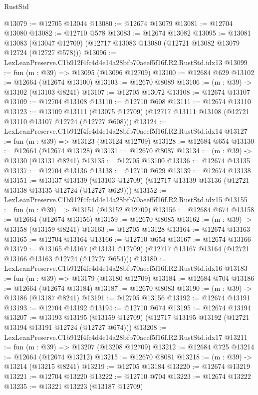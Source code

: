 \begin{lexlean}{RustStd}
\begin{coremodule}
@13079 := @12705 @13044
@13080 := @12674 @13079
@13081 := @12704 @13080
@13082 := @12710 @578
@13083 := @12674 @13082
@13095 := @13081
    @13083
    (@13047 @12709)
    (@12717 @13083 @13080 (@12721 @13082 @13079 @12724 (@12727 @578)))
@13096 := LexLeanPreserve.C1b912f4fc4d4e14a28bfb70aeef5f16f.R2.RustStd.idx13
@13099 := fun (m : @39) => @13095 (@13096 @12709)
@13100 := @12684 @629
@13102 := @12664 (@12674 @13100)
@13103 := @12670 @8089
@13106 := (m : @39) -> @13102 (@13103 @8241)
@13107 := @12705 @13072
@13108 := @12674 @13107
@13109 := @12704 @13108
@13110 := @12710 @608
@13111 := @12674 @13110
@13123 := @13109
    @13111
    (@13075 @12709)
    (@12717 @13111 @13108 (@12721 @13110 @13107 @12724 (@12727 @608)))
@13124 := LexLeanPreserve.C1b912f4fc4d4e14a28bfb70aeef5f16f.R2.RustStd.idx14
@13127 := fun (m : @39) => @13123 (@13124 @12709)
@13128 := @12684 @654
@13130 := @12664 (@12674 @13128)
@13131 := @12670 @8087
@13134 := (m : @39) -> @13130 (@13131 @8241)
@13135 := @12705 @13100
@13136 := @12674 @13135
@13137 := @12704 @13136
@13138 := @12710 @629
@13139 := @12674 @13138
@13151 := @13137
    @13139
    (@13103 @12709)
    (@12717 @13139 @13136 (@12721 @13138 @13135 @12724 (@12727 @629)))
@13152 := LexLeanPreserve.C1b912f4fc4d4e14a28bfb70aeef5f16f.R2.RustStd.idx15
@13155 := fun (m : @39) => @13151 (@13152 @12709)
@13156 := @12684 @674
@13158 := @12664 (@12674 @13156)
@13159 := @12670 @8085
@13162 := (m : @39) -> @13158 (@13159 @8241)
@13163 := @12705 @13128
@13164 := @12674 @13163
@13165 := @12704 @13164
@13166 := @12710 @654
@13167 := @12674 @13166
@13179 := @13165
    @13167
    (@13131 @12709)
    (@12717 @13167 @13164 (@12721 @13166 @13163 @12724 (@12727 @654)))
@13180 := LexLeanPreserve.C1b912f4fc4d4e14a28bfb70aeef5f16f.R2.RustStd.idx16
@13183 := fun (m : @39) => @13179 (@13180 @12709)
@13184 := @12684 @704
@13186 := @12664 (@12674 @13184)
@13187 := @12670 @8083
@13190 := (m : @39) -> @13186 (@13187 @8241)
@13191 := @12705 @13156
@13192 := @12674 @13191
@13193 := @12704 @13192
@13194 := @12710 @674
@13195 := @12674 @13194
@13207 := @13193
    @13195
    (@13159 @12709)
    (@12717 @13195 @13192 (@12721 @13194 @13191 @12724 (@12727 @674)))
@13208 := LexLeanPreserve.C1b912f4fc4d4e14a28bfb70aeef5f16f.R2.RustStd.idx17
@13211 := fun (m : @39) => @13207 (@13208 @12709)
@13212 := @12684 @725
@13214 := @12664 (@12674 @13212)
@13215 := @12670 @8081
@13218 := (m : @39) -> @13214 (@13215 @8241)
@13219 := @12705 @13184
@13220 := @12674 @13219
@13221 := @12704 @13220
@13222 := @12710 @704
@13223 := @12674 @13222
@13235 := @13221
    @13223
    (@13187 @12709)

\end{coremodule}
\end{lexlean}
